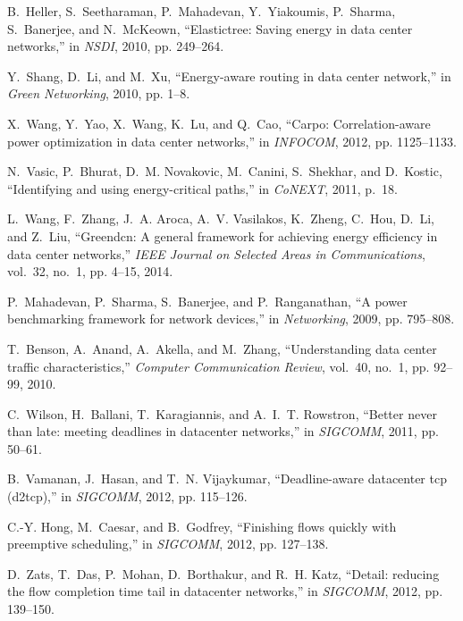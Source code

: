 \documentclass[10pt, conference, compsocconf]{IEEEtran}
\begin{document}
\begin{thebibliography}{1}

B.~Heller, S.~Seetharaman, P.~Mahadevan, Y.~Yiakoumis, P.~Sharma, S.~Banerjee,
  and N.~McKeown, ``Elastictree: Saving energy in data center networks,'' in
  \emph{NSDI}, 2010, pp. 249--264.

Y.~Shang, D.~Li, and M.~Xu, ``Energy-aware routing in data center network,'' in
  \emph{Green Networking}, 2010, pp. 1--8.

X.~Wang, Y.~Yao, X.~Wang, K.~Lu, and Q.~Cao, ``Carpo: Correlation-aware power
  optimization in data center networks,'' in \emph{INFOCOM}, 2012, pp.
  1125--1133.

N.~Vasic, P.~Bhurat, D.~M. Novakovic, M.~Canini, S.~Shekhar, and D.~Kostic,
  ``Identifying and using energy-critical paths,'' in \emph{CoNEXT}, 2011,
  p.~18.

L.~Wang, F.~Zhang, J.~A. Aroca, A.~V. Vasilakos, K.~Zheng, C.~Hou, D.~Li, and
  Z.~Liu, ``Greendcn: A general framework for achieving energy efficiency in
  data center networks,'' \emph{IEEE Journal on Selected Areas in
  Communications}, vol.~32, no.~1, pp. 4--15, 2014.

P.~Mahadevan, P.~Sharma, S.~Banerjee, and P.~Ranganathan, ``A power
  benchmarking framework for network devices,'' in \emph{Networking}, 2009, pp.
  795--808.

T.~Benson, A.~Anand, A.~Akella, and M.~Zhang, ``Understanding data center
  traffic characteristics,'' \emph{Computer Communication Review}, vol.~40,
  no.~1, pp. 92--99, 2010.

C.~Wilson, H.~Ballani, T.~Karagiannis, and A.~I.~T. Rowstron, ``Better never
  than late: meeting deadlines in datacenter networks,'' in \emph{SIGCOMM},
  2011, pp. 50--61.

B.~Vamanan, J.~Hasan, and T.~N. Vijaykumar, ``Deadline-aware datacenter tcp
  (d2tcp),'' in \emph{SIGCOMM}, 2012, pp. 115--126.

C.-Y. Hong, M.~Caesar, and B.~Godfrey, ``Finishing flows quickly with
  preemptive scheduling,'' in \emph{SIGCOMM}, 2012, pp. 127--138.

D.~Zats, T.~Das, P.~Mohan, D.~Borthakur, and R.~H. Katz, ``Detail: reducing the
  flow completion time tail in datacenter networks,'' in \emph{SIGCOMM}, 2012,
  pp. 139--150.


\end{thebibliography}
\end{document}
